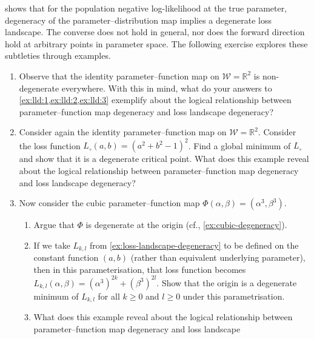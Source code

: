 \documentclass[11pt]{article}
\newcommand{\R}{\mathbb{R}}
\newcommand{\W}{\mathcal{W}}
\begin{document}
 shows that for the population negative log-likelihood at
the true parameter, degeneracy of the parameter--distribution map implies a
degenerate loss landscape. The converse does not hold in general, nor does the
forward direction hold at arbitrary points in parameter space. The following
exercise explores these subtleties through examples.

\begin{exercise}
\label{ex:loss-degeneracy-examples}
\begin{enumerate}
    \item
        Observe that the identity parameter--function map on $\W = \R^2$
        is non-degenerate everywhere. With this in mind, what do your answers
        to \cref{ex:lld:1,ex:lld:2,ex:lld:3} exemplify about the logical
        relationship between parameter--function map degeneracy and loss
        landscape degeneracy?
    \item
        Consider again the identity parameter--function map on $\W = \R^2$.
        Consider the loss function $L_\circ(a,b) = (a^2 + b^2 - 1)^2$.
        Find a global minimum of $L_\circ$ and show that it is a degenerate
        critical point.
        What does this example reveal about the logical relationship between
        parameter--function map degeneracy and loss landscape degeneracy?
    \item
        Now consider the cubic parameter--function map
            $\Phi(\alpha, \beta) = (\alpha^3, \beta^3)$.
        \begin{enumerate}
            \item
                Argue that $\Phi$ is degenerate at the origin (cf.,
                \cref{ex:cubic-degeneracy}).
            \item
                If we take $L_{k,l}$ from \cref{ex:loss-landscape-degeneracy} to be
                defined on the constant function $(a, b)$ (rather than equivalent
                underlying parameter), then in this parameterisation, that loss
                function becomes
                    $L_{k,l}(\alpha,\beta) = (\alpha^3)^{2k} + (\beta^3)^{2l}$.
                Show that the origin is a degenerate minimum of $L_{k,l}$ for all
                $k \geq 0$ and $l \geq 0$ under this parametrisation.
            \item
                What does this example reveal about the logical relationship
                between parameter--function map degeneracy and loss landscape

\end{enumerate}
\end{enumerate}
\end{exercise}
\end{document}
